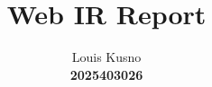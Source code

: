 \documentclass[12pt,a4paper]{article}
\begin{document}
\title{Web IR Report}
\author{Louis Kusno \\
	\textbf{2025403026}}
\date{}
\maketitle


\tableofcontents
\clearpage









\end{document}

